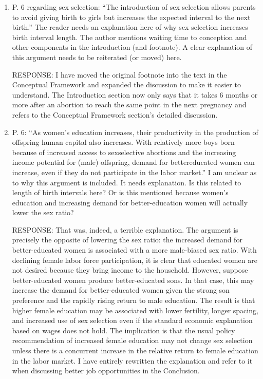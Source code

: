 \documentclass[letterpaper,12pt]{article}
\begin{document}
\begin{enumerate}
\begin{enumerate}
\item  P. 6 regarding sex selection: “The introduction of sex selection allows parents to avoid
giving birth to girls but increases the expected interval to the next birth.” The reader
needs an explanation here of why sex selection increases birth interval length. The author
mentions waiting time to conception and other components in the introduction (and
footnote). A clear explanation of this argument needs to be reiterated (or moved) here.

RESPONSE: I have moved the original footnote into the text in the Conceptual Framework and
expanded the discussion to make it easier to understand.
The Introduction section now only says that it takes 6 months or more after an abortion to
reach the same point in the next pregnancy and refers to the Conceptual Framework section's
detailed discussion.


\item  P. 6: “As women’s education increases, their productivity in the production of offspring
human capital also increases. With relatively more boys born because of increased access to
sexselective abortions and the increasing income potential for (male) offspring, demand for
bettereducated women can increase, even if they do not participate in the labor market.” I
am unclear as to why this argument is included. It needs explanation. Is this related to
length of birth intervals here? Or is this mentioned because women’s education and
increasing demand for better-education women will actually lower the sex ratio?

RESPONSE: That was, indeed, a terrible explanation. The argument is precisely the opposite
of lowering the sex ratio: the increased demand for better-educated women is associated 
with a more male-biased sex ratio. 
With declining female labor force participation, it is clear that educated women are
not desired because they bring income to the household. 
However, suppose better-educated women produce better-educated sons. 
In that case, this may increase the demand for better-educated women given the strong son 
preference and the rapidly rising return to male education. 
The result is that higher female education may be associated with lower fertility, longer 
spacing, and increased use of sex selection even if the standard economic explanation based 
on wages does not hold. 
The implication is that the usual policy recommendation of increased female education may not
change sex selection unless there is a concurrent increase in the relative return to female
education in the labor market. 
I have entirely rewritten the explanation and refer to it when discussing better job 
opportunities in the Conclusion.



\end{enumerate}
\end{enumerate}
\end{document}
